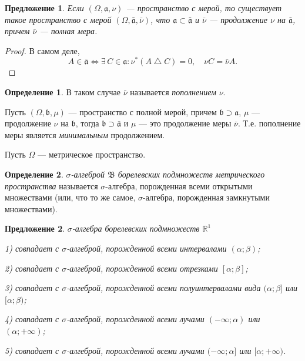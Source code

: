 \documentclass[12pt,titlepage]{article}
\newcounter{tema}
\newtheorem{predl}{Предложение}[tema]
\theoremstyle{definition}
\newtheorem{defen}{Определение}[tema]
\begin{document}
\begin{predl}
Если $(\Omega,\mathfrak{a},\nu)$ --- пространство с мерой, то
существует такое пространство с мерой
$(\Omega,\bar{\mathfrak{a}},\bar{\nu})$, что
$\mathfrak{a}\subset\bar{\mathfrak{a}}$ и $\bar{\nu}$ ---
продолжение $\nu$ на $\bar{\mathfrak{a}}$, причем $\bar{\nu}$ ---
полная мера.
\end{predl}

\begin{proof}
В самом деле, $$A\in\bar{\mathfrak{a}}\Leftrightarrow \exists\,
C\in\mathfrak{a}: \nu^*(A\bigtriangleup C)=0,\quad \nu
C=\bar{\nu}A.$$
\end{proof}

\begin{defen}
В таком случае $\bar{\nu}$ называется \emph{пополнением} $\nu$.
\end{defen}

Пусть $(\Omega,\mathfrak{b},\mu)$ --- пространство с полной мерой,
причем $\mathfrak{b}\supset\mathfrak{a}$, $\mu$ --- продолжение
$\nu$ на $\mathfrak{b}$, тогда
$\mathfrak{b}\supset\bar{\mathfrak{a}}$ и $\mu$ --- это продолжение
меры $\bar{\nu}$. Т.е. пополнение меры является \emph{минимальным}
продолжением.

Пусть $\Omega$ --- метрическое пространство.

\begin{defen}
\emph{$\sigma$-алгеброй $\mathfrak{B}$ борелевских подмножеств
метрического пространства} называется $\sigma$-алгебра, порожденная
всеми открытыми множествами (или, что то же самое, $\sigma$-алгебра,
порожденная замкнутыми множествами).
\end{defen}

\begin{predl}
$\sigma$-алгебра борелевских подмножеств $\mathbb{R}^1$

1) совпадает с $\sigma$-алгеброй, порожденной всеми интервалами
$(\alpha;\beta)$;

2) совпадает с $\sigma$-алгеброй, порожденной всеми отрезками
$[\alpha;\beta]$;

3) совпадает с $\sigma$-алгеброй, порожденной всеми полуинтервалами
вида $(\alpha;\beta]$ или $[\alpha;\beta)$;

4) совпадает с $\sigma$-алгеброй, порожденной всеми лучами
$(-\infty;\alpha)$ или $(\alpha;+\infty)$;

5) совпадает с $\sigma$-алгеброй, порожденной всеми лучами
$(-\infty;\alpha]$ или $[\alpha;+\infty)$.
\end{predl}
\end{document}
